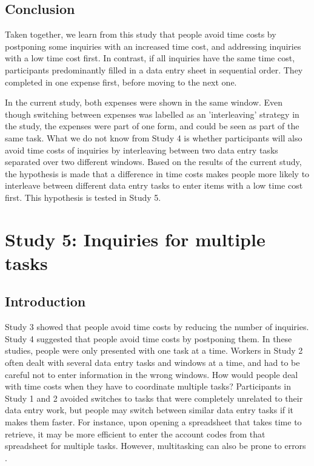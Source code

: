 \subsection{Conclusion}
Taken together, we learn from this study that people avoid time costs by postponing some inquiries with an increased time cost, and addressing inquiries with a low time cost first. In contrast, if all inquiries have the same time cost, participants predominantly filled in a data entry sheet in sequential order. They completed in one expense first, before moving to the next one. 

In the current study, both expenses were shown in the same window. Even though switching between expenses was labelled as an 'interleaving' strategy in the study, the expenses were part of one form, and could be seen as part of the same task. What we do not know from Study 4 is whether participants will also avoid time costs of inquiries by interleaving between two data entry tasks separated over two different windows. Based on the results of the current study, the hypothesis is made that a difference in time costs makes people more likely to interleave between different data entry tasks to enter items with a low time cost first. This hypothesis is tested in Study 5.



\section{Study 5: Inquiries for multiple tasks}
\subsection{Introduction}
Study 3 showed that people avoid time costs by reducing the number of inquiries. Study 4 suggested that people avoid time costs by postponing them. In these studies, people were only presented with one task at a time. Workers in Study 2 often dealt with several data entry tasks and windows at a time, and had to be careful not to enter information in the wrong windows. How would people deal with time costs when they have to coordinate multiple tasks? Participants in Study 1 and 2 avoided switches to tasks that were completely unrelated to their data entry work, but people may switch between similar data entry tasks if it makes them faster. For instance, upon opening a spreadsheet that takes time to retrieve, it may be more efficient to enter the account codes from that spreadsheet for multiple tasks. However, multitasking can also be prone to errors \citep{Carrier2015}.

